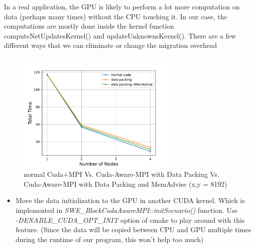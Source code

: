 \documentclass[article]{scrartcl}
\begin{document}
In a real application, the GPU is likely to perform a lot more computation on data (perhaps many times) without the CPU touching it. In our case, the computations are mostly done inside
the kernel function computeNetUpdatesKernel() and updateUnknownsKernel().
There are a few different ways that we can eliminate or change the migration overhead 
\begin{figure}[htpb]
	\centering
	\includegraphics[width=0.7\textwidth,keepaspectratio=true]{../figs/Comparison_CUDA_PACKING_MemAdvise.png}
	\caption{normal Cuda+MPI Vs. Cuda-Aware-MPI with Data Packing Vs. Cuda-Aware-MPI with Data Packing and MemAdvise (x,y = 8192) }
	\label{fig:CompareCudaPackingMem}
\end{figure}

\begin{itemize}
    \item  Move the data initialization to the GPU in another CUDA kernel. 
	Which is implemented in \textit{SWE\_BlockCudaAwareMPI::initScenario()} function. 
	Use \\
	\textit{-DENABLE\_CUDA\_OPT\_INIT} option of cmake to play around with this feature. (Since the data will be copied between CPU and GPU multiple times during the runtime of our program, this won't help too much)
\end{itemize}
\end{document}
